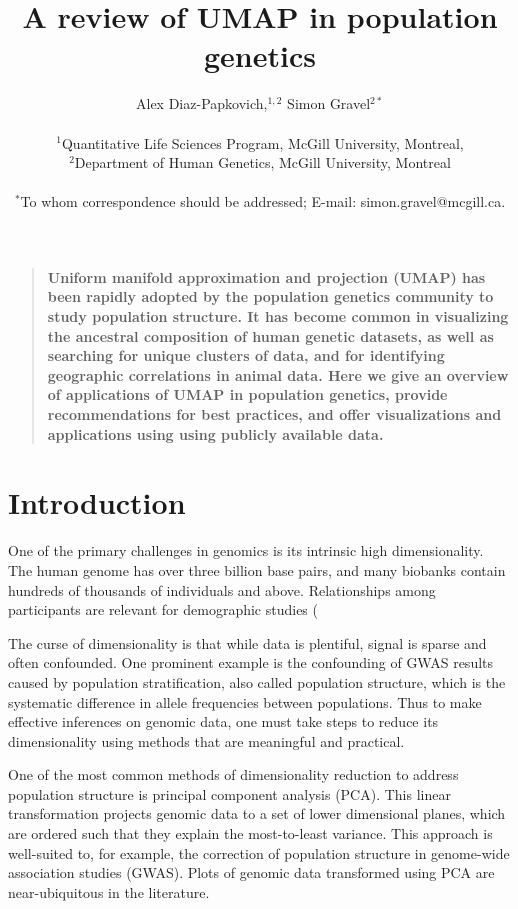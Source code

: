 \documentclass[12pt]{article}
\title{A review of UMAP in population genetics}
\author
{Alex Diaz-Papkovich,$^{1,2}$ Simon Gravel$^{2\ast}$\\
\\
\normalsize{$^{1}$Quantitative Life Sciences Program, McGill University, Montreal,}\\
\normalsize{$^{2}$Department of Human Genetics, McGill University, Montreal}\\
\\
\normalsize{$^\ast$To whom correspondence should be addressed; E-mail:  simon.gravel@mcgill.ca.}
}
\date{}
\newenvironment{sciabstract}{%
\begin{quote} \bf}
{\end{quote}}
\begin{document}
 


\baselineskip24pt


\maketitle 



\begin{sciabstract}
Uniform manifold approximation and projection (UMAP) has been rapidly adopted by the population genetics community to study population structure. It has become common in visualizing the ancestral composition of human genetic datasets, as well as searching for unique clusters of data, and for identifying geographic correlations in animal data. Here we give an overview of applications of UMAP in population genetics, provide recommendations for best practices, and offer visualizations and applications using using publicly available data.
\end{sciabstract}

\section*{Introduction}
One of the primary challenges in genomics is its intrinsic high dimensionality. The human genome has over three billion base pairs, and many biobanks contain hundreds of thousands of individuals and above. Relationships among participants are relevant for demographic studies (

The curse of dimensionality is that while data is plentiful, signal is sparse and often confounded. One prominent example is the confounding of GWAS results caused by population stratification, also called population structure, which is the systematic difference in allele frequencies between populations. Thus to make effective inferences on genomic data, one must take steps to reduce its dimensionality using methods that are meaningful and practical. 

One of the most common methods of dimensionality reduction to address population structure is principal component analysis (PCA). This linear transformation projects genomic data to a set of lower dimensional planes, which are ordered such that they explain the most-to-least variance. This approach is well-suited to, for example, the correction of population structure in genome-wide association studies (GWAS).\cite{patterson2006population} Plots of genomic data transformed using PCA are near-ubiquitous in the literature.
\end{document}
